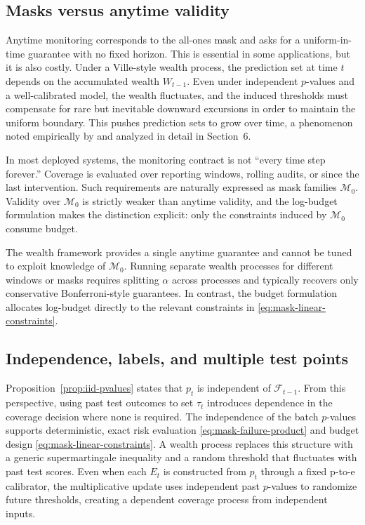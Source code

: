 \documentclass{uai2026} %
\newcommand{\1}{\mathbf{1}}
\newcommand{\F}{\mathcal{F}}
\newcommand{\mcal}{\mathcal{M}}
\begin{document}
\subsection{Masks versus anytime validity}
\label{sec:masks-vs-anytime}

Anytime monitoring corresponds to the all-ones mask and asks for a uniform-in-time guarantee with no fixed horizon.
This is essential in some applications, but it is also costly.
Under a Ville-style wealth process, the prediction set at time $t$ depends on the accumulated wealth $W_{t-1}$.
Even under independent $p$-values and a well-calibrated model, the wealth fluctuates, and the induced thresholds must compensate for rare but inevitable downward excursions in order to maintain the uniform boundary.
This pushes prediction sets to grow over time, a phenomenon noted empirically by \citet{gauthier2025values} and analyzed in detail in Section~6.

In most deployed systems, the monitoring contract is not ``every time step forever.''
Coverage is evaluated over reporting windows, rolling audits, or since the last intervention.
Such requirements are naturally expressed as mask families $\mcal_0$.
Validity over $\mcal_0$ is strictly weaker than anytime validity, and the log-budget formulation makes the distinction explicit: only the constraints induced by $\mcal_0$ consume budget.

The wealth framework provides a single anytime guarantee and cannot be tuned to exploit knowledge of $\mcal_0$.
Running separate wealth processes for different windows or masks requires splitting $\alpha$ across processes and typically recovers only conservative Bonferroni-style guarantees.
In contrast, the budget formulation allocates log-budget directly to the relevant constraints in \eqref{eq:mask-linear-constraints}.

\subsection{Independence, labels, and multiple test points}
\label{sec:dependence}

Proposition~\ref{prop:iid-pvalues} states that $p_t$ is independent of $\F_{t-1}$.
From this perspective, using past test outcomes to set $\tau_t$ introduces dependence in the coverage decision where none is required.
The independence of the batch $p$-values supports deterministic, exact risk evaluation \eqref{eq:mask-failure-product} and budget design \eqref{eq:mask-linear-constraints}.
A wealth process replaces this structure with a generic supermartingale inequality and a random threshold that fluctuates with past test scores.
Even when each $E_t$ is constructed from $p_t$ through a fixed p-to-e calibrator, the multiplicative update uses independent past $p$-values to randomize future thresholds, creating a dependent coverage process from independent inputs.
\end{document}
